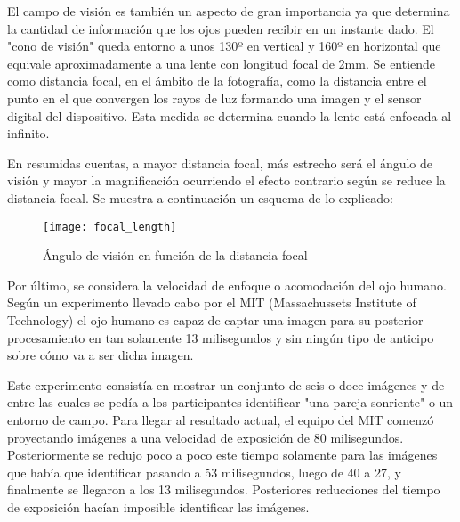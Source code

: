 El campo de visión es también un aspecto de gran importancia ya que determina la cantidad de información que los ojos pueden recibir en un instante dado. El "cono de visión" queda entorno a unos 130º en vertical y 160º en horizontal que equivale aproximadamente a una lente con longitud focal de 2mm. Se entiende como distancia focal, en el ámbito de la fotografía, como la distancia entre el punto en el que convergen los rayos de luz formando una imagen y el sensor digital del dispositivo. Esta medida se determina cuando la lente está enfocada al infinito.

En resumidas cuentas, a mayor distancia focal, más estrecho será el ángulo de visión y mayor la magnificación ocurriendo el efecto contrario según se reduce la distancia focal. Se muestra a continuación un esquema de lo explicado: 


\begin{figure}[!htb]
\centering
{}
  \texttt{[image: focal\_length]}
  \caption{Ángulo de visión en función de la distancia focal}\label{fig:focal_length}
\endminipage\hfill

\end{figure}



Por último, se considera la velocidad de enfoque o acomodación del ojo humano. Según un experimento llevado cabo por el MIT (Massachussets Institute of Technology) el ojo humano es capaz de captar una imagen para su posterior procesamiento en tan solamente 13 milisegundos y sin ningún tipo de anticipo sobre cómo va a ser dicha imagen.


Este experimento consistía en  mostrar un conjunto de seis o doce imágenes y de entre las cuales se pedía a los participantes identificar "una pareja sonriente" o un entorno de campo. 
Para llegar al resultado actual, el equipo del MIT comenzó proyectando imágenes a una velocidad de exposición de 80 milisegundos. Posteriormente se redujo poco a poco este tiempo solamente para las imágenes que había que identificar pasando a 53 milisegundos, luego de 40 a 27, y finalmente se llegaron a los 13 milisegundos. Posteriores reducciones del tiempo de exposición hacían imposible identificar las imágenes.



